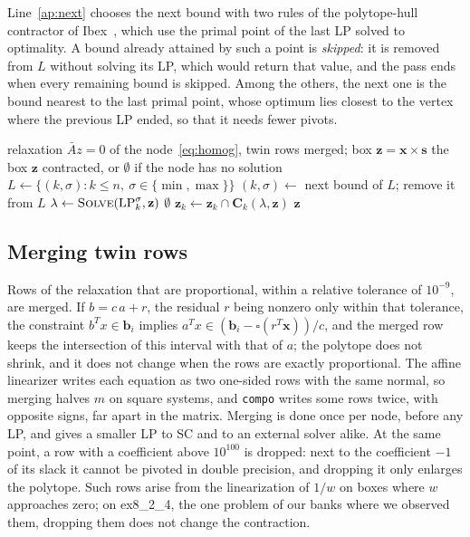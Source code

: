 \documentclass[11pt]{article}
\newcommand{\iv}[1]{\mathbf{#1}}          %
\newcommand{\Abar}{\bar{A}}
\theoremstyle{definition}
\theoremstyle{remark}
\begin{document}
Line~\ref{ap:next} chooses the next bound with two rules of the
polytope-hull contractor of Ibex~\cite{baharev2009distillation}, which use the
primal point of the last LP solved to optimality. A bound already attained by
such a point is \emph{skipped}: it is removed from $L$ without solving its LP,
which would return that value, and the pass ends when every remaining bound is
skipped. Among the others, the next one is the bound nearest to the last
primal point, whose optimum lies closest to the vertex where the previous LP
ended, so that it needs fewer pivots.

\begin{algorithm}[t]
\caption{One pass over the bounds of a node. \textsc{Solve} is the LP engine,
SC (Algorithm~\ref{alg:sc}) or an external solver.}\label{alg:pass}
\begin{algorithmic}[1]
\Require relaxation $\Abar z=0$ of the node~\eqref{eq:homog}, twin rows merged;
  box $\iv{z}=\iv{x}\times\iv{s}$
\Ensure the box $\iv{z}$ contracted, or $\emptyset$ if the node has no solution
\State $L\gets\{(k,\sigma): k\le n,\ \sigma\in\{\min,\max\}\}$\label{ap:init}
  \State $(k,\sigma)\gets$ next bound of $L$; remove it from $L$
    \label{ap:next}
  \State $\lambda\gets\textsc{Solve}(\mathrm{LP}_k^{\sigma},\iv{z})$
    \label{ap:solve}
  \If{$0\notin\iv{R}(\lambda,\iv{z})$} \Return $\emptyset$
     \label{ap:empty}
  \EndIf
  \State $\iv{z}_k\gets\iv{z}_k\cap\iv{C}_k(\lambda,\iv{z})$
    \label{ap:contract}
\EndWhile
\State \Return $\iv{z}$
\end{algorithmic}
\end{algorithm}

\subsection{Merging twin rows}\label{sec:merge}

Rows of the relaxation that are proportional, within a relative tolerance of
$10^{-9}$, are merged. If $b=c\,a+r$, the residual $r$ being nonzero only
within that tolerance, the constraint $b^Tx\in\iv{b}_i$ implies
$a^Tx\in(\iv{b}_i-\square(r^T\iv{x}))/c$, and the merged row keeps the
intersection of this interval with that of $a$; the polytope does not
shrink, and it does not change when the rows are exactly proportional. The
affine linearizer writes each equation as two one-sided rows with the same
normal, so merging halves $m$ on square systems, and \texttt{compo} writes
some rows twice, with opposite signs, far apart in the matrix. Merging is done
once per node, before any LP, and gives a smaller LP to SC and to an external
solver alike. At the same point, a row with a coefficient above $10^{100}$ is
dropped: next to the coefficient $-1$ of its slack it cannot be pivoted in
double precision, and dropping it only enlarges the polytope. Such rows arise
from the linearization of $1/w$ on boxes where $w$ approaches zero; on
ex8\_2\_4, the one problem of our banks where we observed them, dropping them
does not change the contraction.
\end{document}

